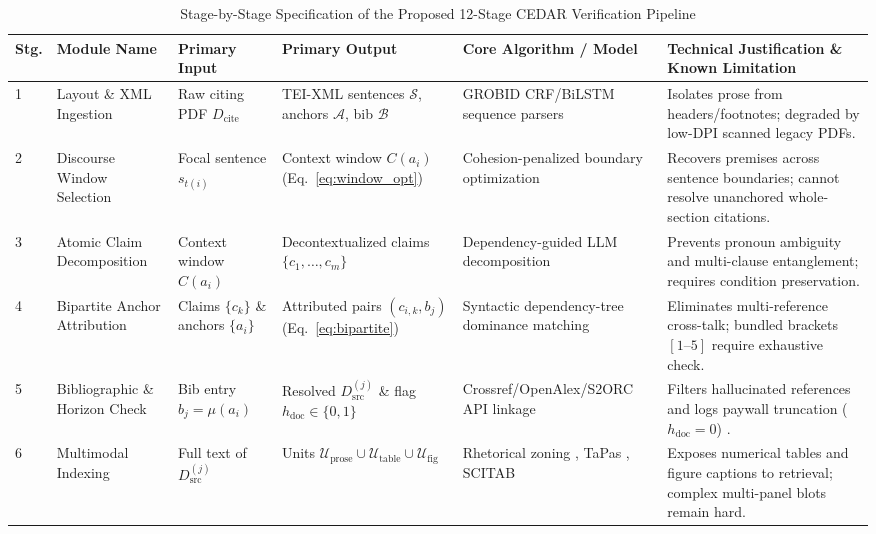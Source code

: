 \documentclass[sigconf]{acmart}
\begin{document}
\begin{table}[t]
\centering
\footnotesize
\caption{Stage-by-Stage Specification of the Proposed 12-Stage CEDAR Verification Pipeline}
\label{tab:pipeline_stages}
\renewcommand{\arraystretch}{1.13}
\begin{tabularx}{\textwidth}{C{0.5cm} L{2.5cm} L{2.3cm} L{2.4cm} L{3.2cm} Y}
\toprule
\textbf{Stg.} & \textbf{Module Name} & \textbf{Primary Input} & \textbf{Primary Output} & \textbf{Core Algorithm / Model} & \textbf{Technical Justification \& Known Limitation} \\
 & Layout \& XML Ingestion & Raw citing PDF $D_{\text{cite}}$ & TEI-XML sentences $\mathcal{S}$, anchors $\mathcal{A}$, bib $\mathcal{B}$ & GROBID \cite{lopez2009grobid} CRF/BiLSTM sequence parsers & Isolates prose from headers/footnotes; degraded by low-DPI scanned legacy PDFs. \\
2 & Discourse Window Selection & Focal sentence $s_{t(i)}$ & Context window $C(a_i)$ (Eq.~\ref{eq:window_opt}) & Cohesion-penalized boundary optimization \cite{jurgens2018measuring} & Recovers premises across sentence boundaries; cannot resolve unanchored whole-section citations. \\
3 & Atomic Claim Decomposition & Context window $C(a_i)$ & Decontextualized claims $\{c_1, \dots, c_m\}$ & Dependency-guided LLM decomposition \cite{kamoi2023wice,min2023factscore} & Prevents pronoun ambiguity and multi-clause entanglement; requires condition preservation. \\
4 & Bipartite Anchor Attribution & Claims $\{c_k\}$ \& anchors $\{a_i\}$ & Attributed pairs $(c_{i,k}, b_j)$ (Eq.~\ref{eq:bipartite}) & Syntactic dependency-tree dominance matching & Eliminates multi-reference cross-talk; bundled brackets $[1\text{--}5]$ require exhaustive check. \\
5 & Bibliographic \& Horizon Check & Bib entry $b_j = \mu(a_i)$ & Resolved $D_{\text{src}}^{(j)}$ \& flag $h_{\text{doc}} \in \{0,1\}$ & Crossref/OpenAlex/S2ORC API linkage \cite{lo2020s2orc} & Filters hallucinated references and logs paywall truncation ($h_{\text{doc}}=0$) \cite{lariviere2015oligopoly}. \\
6 & Multimodal Indexing & Full text of $D_{\text{src}}^{(j)}$ & Units $\mathcal{U}_{\text{prose}} \cup \mathcal{U}_{\text{table}} \cup \mathcal{U}_{\text{fig}}$ & Rhetorical zoning \cite{teufel2006automatic}, TaPas \cite{herzig2020tapas}, SCITAB \cite{lu2023scitab} & Exposes numerical tables and figure captions to retrieval; complex multi-panel blots remain hard. \\

\end{tabularx}
\end{table}
\end{document}
